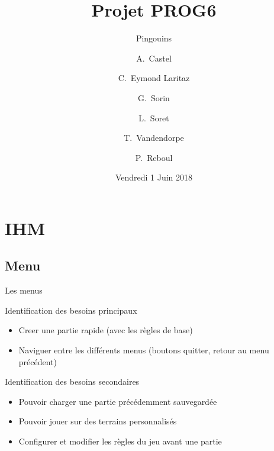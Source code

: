 \documentclass{beamer}
\title{Projet PROG6}
\subtitle{Pingouins}
\author{A.~Castel \and C.~Eymond Laritaz \and G.~Sorin \and L.~Soret \and T.~Vandendorpe \and P.~Reboul}
\institute[Université Grenoble-Alpes] %
{
  UFR IM²AG\\
  Université Grenoble-Alpes
}
\date{Vendredi 1 Juin 2018}
\begin{document}
\begin{frame}
  \titlepage
\end{frame}

\begin{frame}{}
  \tableofcontents
\end{frame}

\section{IHM}

\subsection{Menu}

\begin{frame}{Les menus}
  \begin{block}{Identification des besoins principaux}
	\begin{itemize}
	\item <1-> Creer une partie rapide (avec les règles de base)
	\item <2-> Naviguer entre les différents menus (boutons quitter, retour au menu précédent)
  	\end{itemize}
  \end{block}
\end{frame}

\begin{frame}{}
  \begin{block}{Identification des besoins secondaires}
	\begin{itemize}
	\item <1-> Pouvoir charger une partie précédemment sauvegardée
	\item <2-> Pouvoir jouer sur des terrains personnalisés
	\item <3-> Configurer et modifier les règles du jeu avant une partie
  	\end{itemize}
  \end{block}
\end{frame}
\end{document}
